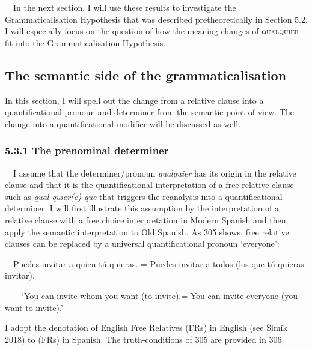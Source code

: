 \begin{styleStandard}
\ \ In the next section, I will use these results to investigate the Grammaticalisation Hypothesis that was described pretheoretically in Section 5.2. I will especially focus on the question of how the meaning changes of \textsc{qualquier} fit into the Grammaticalisation Hypothesis.
\end{styleStandard}

\subsection[The semantic side of the grammaticalisation]{The semantic side of the grammaticalisation}
\begin{styleStandard}
In this section, I will spell out the change from a relative clause into a quantificational pronoun and determiner from the semantic point of view. The change into a quantificational modifier will be discussed as well.
\end{styleStandard}

\subsubsection[5.3.1 The prenominal determiner]{\textbf{5.3.1 The prenominal determiner}}
\begin{styleStandard}
\ \ I assume that the determiner/pronoun \textit{qualquier} has its origin in the relative clause and that it is the quantificational interpretation of a free relative clause such as \textit{qual quier(e) que} that triggers the reanalysis into a quantificational determiner. I will first illustrate this assumption by the interpretation of a relative clause with a free choice interpretation in Modern Spanish and then apply the semantic interpretation to Old Spanish. As 305 shows, free relative clauses can be replaced by a universal quantificational pronoun ‘everyone’:
\end{styleStandard}

\begin{styleStandard}
\ \ Puedes invitar a quien tú quieras. = Puedes invitar a todos (los que tú quieras invitar).
\end{styleStandard}

\begin{styleStandard}
\ \ \ \ ‘You can invite whom you want (to invite).= You can invite everyone (you want to invite).’
\end{styleStandard}

\begin{styleStandard}
I adopt the denotation of English Free Relatives (FRs) in English (see Šimík 2018) to (FRs) in Spanish. The truth-conditions of 305 are provided in 306.
\end{styleStandard}

